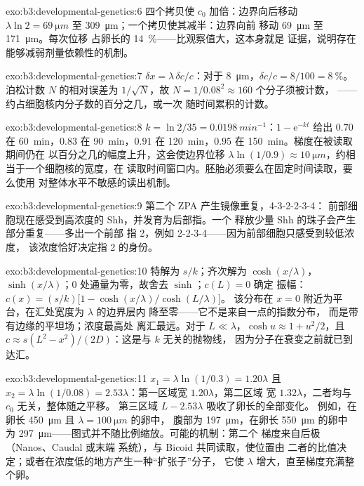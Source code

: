 \begin{solution}{exo:b3:developmental-genetics:6}
四个拷贝使 $c_{0}$ 加倍：边界向后移动 $\lambda\ln 2 =
\qty{69}{\micro m}$ 至 \qty{309}{\micro m}；一个拷贝使其减半：边界向前
移动 \qty{69}{\micro m} 至 \qty{171}{\micro m}。每次位移
占卵长的 \qty{14}{\%}——比观察值大，这本身就是
证据，说明存在能够减弱剂量依赖性的机制。
\end{solution}

\begin{solution}{exo:b3:developmental-genetics:7}
$\delta x = \lambda\,\delta c/c$：对于 \qty{8}{\micro m}，$\delta c/c =
8/100 = \qty{8}{\%}$。泊松计数 $N$ 的相对误差为
$1/\sqrt{N}$，故 $N = 1/0.08^{2} \approx 160$ 个分子须被计数，
——约占细胞核内分子数的百分之几，或一次
随时间累积的计数。
\end{solution}

\begin{solution}{exo:b3:developmental-genetics:8}
$k = \ln 2/35 = \qty{0.0198}{min^{-1}}$：$1 - \mathrm{e}^{-kt}$ 给出
$0.70$ 在 \qty{60}{min}，$0.83$ 在 \qty{90}{min}，$0.91$ 在
\qty{120}{min}，$0.95$ 在 \qty{150}{min}。梯度在被读取期间仍在
以百分之几的幅度上升，这会使边界位移
$\lambda\ln(1/0.9) \approx \qty{10}{\micro m}$，约相当于一个细胞核的宽度，在
读取时间窗口内。胚胎必须要么在固定时间读取，要么使用
对整体水平不敏感的读出机制。
\end{solution}

\begin{solution}{exo:b3:developmental-genetics:9}
第二个 ZPA 产生镜像重复，4-3-2-2-3-4：
前部细胞现在感受到高浓度的 Shh，并发育为后部指。一个
释放少量 Shh 的珠子会产生部分重复——多出一个前部
指 2，例如 2-2-3-4——因为前部细胞只感受到较低浓度，
该浓度恰好决定指 2 的身份。
\end{solution}

\begin{solution}{exo:b3:developmental-genetics:10}
特解为 $s/k$；齐次解为 $\cosh(x/\lambda)$，
$\sinh(x/\lambda)$；$0$ 处通量为零，故舍去 $\sinh$；$c(L) = 0$ 确定
振幅：$c(x) = (s/k)\bigl[1 - \cosh(x/\lambda)/\cosh(L/\lambda)\bigr]$。
该分布在 $x = 0$ 附近为平台，在汇处宽度为 $\lambda$ 的边界层内
降至零——它不是来自一点的指数分布，
而是带有边缘的平坦场；浓度最高处
离汇最远。对于 $L \ll \lambda$，$\cosh u \approx 1 +
u^{2}/2$，且 $c \approx s(L^{2} - x^{2})/(2D)$：这是与 $k$ 无关的抛物线，
因为分子在衰变之前就已到达汇。
\end{solution}

\begin{solution}{exo:b3:developmental-genetics:11}
$x_{1} = \lambda\ln(1/0.3) = 1.20\lambda$ 且 $x_{2} = \lambda\ln(1/0.08)
= 2.53\lambda$：第一区域宽 $1.20\lambda$，第二区域
宽 $1.32\lambda$，二者均与 $c_{0}$ 无关，整体随之平移。
第三区域 $L - 2.53\lambda$ 吸收了卵长的全部变化。
例如，在卵长 \qty{450}{\micro m} 且 $\lambda = \qty{100}{\micro m}$ 的卵中，
腹部为 \qty{197}{\micro m}，在卵长 \qty{550}{\micro m} 的卵中
为 \qty{297}{\micro m}——图式并不随比例缩放。可能的机制：第二个
梯度来自后极（Nanos、Caudal 或末端
系统），与 Bicoid 共同读取，使位置由
二者的比值决定；或者在浓度低的地方产生一种“扩张子”分子，
它使 $\lambda$ 增大，直至梯度充满整个卵。
\end{solution}


